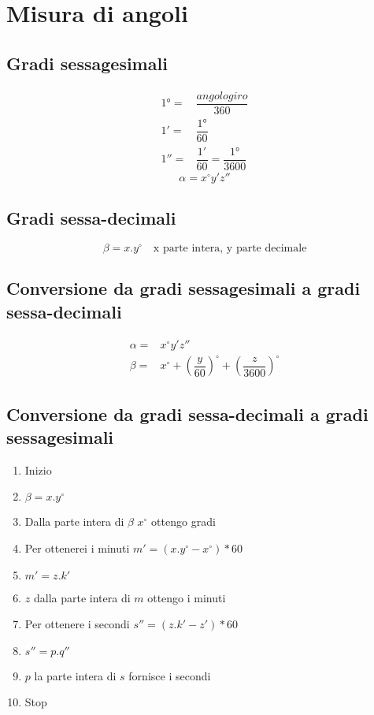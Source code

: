 \chapter{Misura di angoli}
\section{Gradi sessagesimali}
\begin{align*}
\ang{1}=&\dfrac{angolo giro}{360}\\
\ang{;1;}=&\dfrac{\ang{1}}{60}\\
\ang{;;1}=&\dfrac{\ang{;1;}}{60}=\dfrac{\ang{1}}{3600}
\end{align*}
\begin{equation*}
\alpha=x^\circ y'z''
\end{equation*}
\section{Gradi sessa-decimali}
\begin{equation*}
\beta=x.y^\circ\quad\text{x parte intera, y parte decimale}
\end{equation*}
\section{Conversione da gradi sessagesimali a gradi sessa-decimali}
\begin{align*}
\alpha=&x^\circ y'z''\\
\beta=&x^\circ+\left(\dfrac{y}{60}\right)^\circ+\left(\dfrac{z}{3600}\right)^\circ
\end{align*}
\section{Conversione da gradi sessa-decimali  a gradi sessagesimali}
\begin{enumerate}
	\item Inizio
	\item $\beta=x.y^\circ$
	\item Dalla  parte intera di $\beta$ $x^\circ$ ottengo gradi
	\item Per ottenerei i minuti $m'=(x.y^\circ-x^\circ)*60$
	\item $m'=z.k'$
	\item $z$ dalla parte intera di $m$ ottengo i minuti 
	\item Per ottenere i secondi
	$s''=(z.k'-z')*60$ 
	\item $s''=p.q''$
	\item $p$ la parte intera di $s$ fornisce i secondi
	\item Stop
\end{enumerate}
